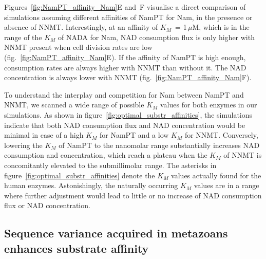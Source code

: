 Figures~\ref{fig:NamPT_affinity_Nam}E and~F visualise a direct comparison of simulations assuming different affinities of NamPT for Nam, in the presence or absence of NNMT. Interestingly, at an affinity of $K_{M}$~= 1\,$\mu$M, which is in the range of the $K_{M}$ of NADA for Nam, NAD consumption flux is only higher with NNMT present when cell division rates are low (fig.~\ref{fig:NamPT_affinity_Nam}E). If the affinity of NamPT is high enough, consumption rates are always higher with NNMT than without it. The NAD concentration is always lower with NNMT (fig.~\ref{fig:NamPT_affinity_Nam}F).

To understand the interplay and competition for Nam between NamPT and NNMT, we scanned a wide range of possible $K_{M}$ values for both enzymes in our simulations. As shown in figure~\ref{fig:optimal_substr_affinities}, the simulations indicate that both NAD consumption flux and NAD concentration would be minimal in case of a high $K_{M}$ for NamPT and a low $K_{M}$ for NNMT. Conversely, lowering the $K_{M}$ of NamPT to the nanomolar range substantially increases NAD consumption and concentration, which reach a plateau when the $K_{M}$ of NNMT is concomitantly elevated to the submillimolar range. The asterisks in figure~\ref{fig:optimal_substr_affinities} denote the $K_{M}$ values actually found for the human enzymes. Astonishingly, the naturally occurring $K_{M}$ values are in a range where further adjustment would lead to little or no increase of NAD consumption flux or NAD concentration.


\subsection{Sequence variance acquired in metazoans enhances substrate affinity}

